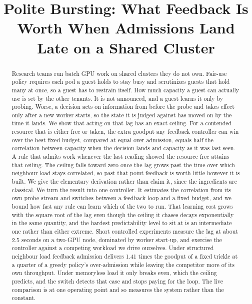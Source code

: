 \documentclass[10pt,conference,letterpaper]{IEEEtran}
\theoremstyle{remark}\newtheorem{remark}{Remark}
\newif\ifblind
\begin{document}
\title{Polite Bursting: What Feedback Is Worth When Admissions
Land Late on a Shared Cluster}

\ifblind\else
\author{
}
\fi

\maketitle

\begin{abstract}
Research teams run batch GPU work on shared clusters they do not own. Fair-use
policy requires each pod a guest holds to stay busy and scrutinizes guests that
hold many at once, so a guest has to restrain itself. How much capacity a guest
can actually use is set by the other tenants. It is not announced, and a guest
learns it only by probing. Worse, a decision acts on information from before the
probe and takes effect only after a new worker starts, so the state it is judged
against has moved on by the time it lands.
We show that acting on that lag has an exact ceiling. For a contended resource
that is either free or taken, the extra goodput any feedback controller can win
over the best fixed budget, compared at equal over-admission, equals half the
correlation between capacity when the decision lands and capacity as it was last
seen. A rule that admits work whenever the last reading showed the resource free
attains that ceiling. The ceiling falls toward zero once the lag grows past the
time over which neighbour load stays correlated, so past that point feedback is
worth little however it is built. We give the elementary derivation rather than
claim it, since the ingredients are classical.
We turn the result into one controller. It estimates the correlation from its own
probe stream and switches between a feedback loop and a fixed budget, and we
bound how fast any rule can learn which of the two to run. That learning cost
grows with the square root of the lag even though the ceiling it chases decays
exponentially in the same quantity, and the hardest predictability level to sit at
is an intermediate one rather than either extreme.
Short controlled experiments measure the lag at about 2.5 seconds on a two-GPU
node, dominated by worker start-up, and exercise the controller against a
competing workload we drive ourselves. Under structured neighbour load feedback
admission delivers 1.41 times the goodput of a fixed trickle at a quarter of a
greedy policy's over-admission while leaving the competitor more of its own
throughput. Under memoryless load it only breaks even, which the ceiling predicts,
and the switch detects that case and stops paying for the loop. The live
comparison is at one operating point and so measures the system rather than the
constant.
\end{abstract}
\end{document}
